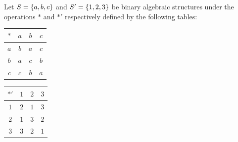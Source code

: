 \documentclass[11pt,fleqn,dvipsnames,usenames]{article}
\begin{document}
%
\begin{example}\label{firstisomorphismexample}
Let $S = \left\{a,b,c\right\}$ and $S' = \left\{1,2,3\right\}$ be binary algebraic structures under the operations $*$ and $*'$ respectively defined by the following tables:
\begin{center}
\bgroup
\begin{center}
\def\arraystretch{1.5}
\begin{tabular}{c|ccc}
$*$ & $a$ & $b$ & $c$\\
\hline
$a$ & $b$ & $a$ & $c$\\
$b$ & $a$ & $c$ & $b$\\
$c$ & $c$ & $b$ & $a$\\
\end{tabular}
\hspace{3cm}
\begin{tabular}{c|ccc}
$*'$ & $1$ & $2$ & $3$\\
\hline
$1$ & $2$ & $1$ & $3$\\
$2$ & $1$ & $3$ & $2$\\
$3$ & $3$ & $2$ & $1$\\
\end{tabular}
\end{center}
\egroup
\end{center}
\end{example}
\vspace{8cm}
\end{document}
